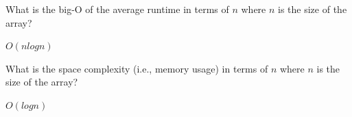 \nextq
What is the big-O of the average runtime
in terms of $n$ where $n$ is the size of the array?
\\
\ANSWER
\begin{answerlong}
$O(nlogn)$
\end{answerlong}

\nextq
What is the space complexity (i.e., memory usage)
in terms of $n$ where $n$ is the size of the array?
\\
\ANSWER
\begin{answerlong}
$O(logn)$
\end{answerlong}


